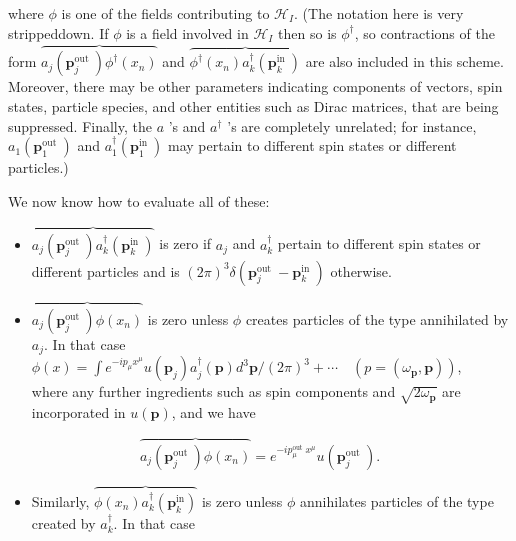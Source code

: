 \documentclass[10pt, letterpaper]{article}
\begin{document}
where $\phi$ is one of the fields contributing to $\mathcal{H}_{I}$. (The notation here is very strippeddown. If $\phi$ is a field involved in $\mathcal{H}_{I}$ then so is $\phi^{\dagger}$, so contractions of the form $\overbrace{a_{j}\left(\mathbf{p}_{j}^{\text {out }}\right) \phi^{\dagger}\left(x_{n}\right)}$ and $\overbrace{\phi^{\dagger}\left(x_{n}\right) a_{k}^{\dagger}\left(\mathbf{p}_{k}^{\text {in }}\right)}$ are also included in this scheme. Moreover, there may be other parameters indicating components of vectors, spin states, particle species, and other entities such as Dirac matrices, that are being suppressed. Finally, the $a$ 's and $a^{\dagger}$ 's are completely unrelated; for instance, $a_{1}\left(\mathbf{p}_{1}^{\text {out }}\right)$ and $a_{1}^{\dagger}\left(\mathbf{p}_{1}^{\text {in }}\right)$ may pertain to different spin states or different particles.)

We now know how to evaluate all of these:

\begin{itemize}
  \item $\overbrace{a_{j}\left(\mathbf{p}_{j}^{\text {out }}\right) a_{k}^{\dagger}\left(\mathbf{p}_{k}^{\text {in }}\right)}$ is zero if $a_{j}$ and $a_{k}^{\dagger}$ pertain to different spin states or different particles and is $(2 \pi)^{3} \delta\left(\mathbf{p}_{j}^{\text {out }}-\mathbf{p}_{k}^{\text {in }}\right)$ otherwise.
  \item $\overbrace{a_{j}\left(\mathbf{p}_{j}^{\text {out }}\right) \phi\left(x_{n}\right)}$ is zero unless $\phi$ creates particles of the type annihilated by $a_{j}$. In that case\\
$\phi(x)=\int e^{-i p_{\mu} x^{\mu}} u\left(\mathbf{p}_{j}\right) a_{j}^{\dagger}(\mathbf{p}) d^{3} \mathbf{p} /(2 \pi)^{3}+\cdots \quad\left(p=\left(\omega_{\mathbf{p}}, \mathbf{p}\right)\right)$,\\
where any further ingredients such as spin components and $\sqrt{2 \omega_{\mathbf{p}}}$ are incorporated in $u(\mathbf{p})$, and we have
\end{itemize}

$$
\overbrace{a_{j}\left(\mathbf{p}_{j}^{\text {out }}\right) \phi\left(x_{n}\right)}=e^{-i p_{\mu}^{\text {out }} x^{\mu}} u\left(\mathbf{p}_{j}^{\text {out }}\right) .
$$

\begin{itemize}
  \item Similarly, $\overbrace{\phi\left(x_{n}\right) a_{k}^{\dagger}\left(\mathbf{p}_{k}^{\mathrm{in}}\right)}$ is zero unless $\phi$ annihilates particles of the type created by $a_{k}^{\dagger}$. In that case
\end{itemize}
\end{document}
